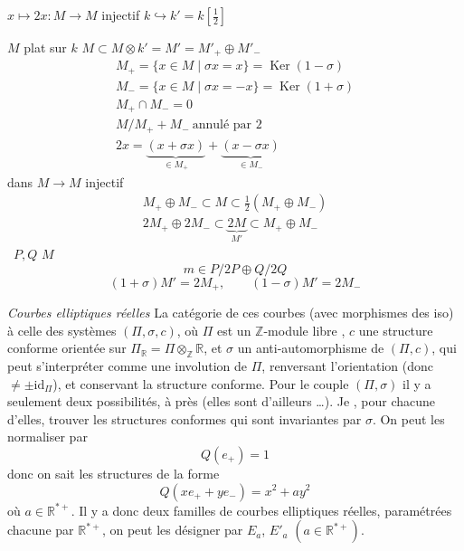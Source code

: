 \documentclass[11pt,a4paper]{article}
\begin{document}
$x \mapsto 2x : M \to M$ injectif \quad
{} $k \hookrightarrow k' = k[\tfrac{1}{2}]$

$M$ plat sur $k$ \quad
$M \subset M \otimes k' = M' = M'_{+} \oplus M'_{-}$ 
\[
\begin{array}{l}
  M_{+} = \{x \in M \mid \sigma x = x\} = \operatorname{Ker}(1 - \sigma) \\
  M_{-} = \{x \in M \mid \sigma x = -x\} = \operatorname{Ker}(1 + \sigma) \\
  M_{+} \cap M_{-} = 0 \\
  M/M_{+} + M_{-} \ \text{annulé par } 2 \\
  2x = \underbrace{(x + \sigma x)}_{\in M_{+}} + \underbrace{(x - \sigma x)}_{\in M_{-}}
\end{array}
\]
dans  $M \to M$ injectif
\[
\begin{array}{l}
  M_{+} \oplus M_{-} \subset M \subset \tfrac{1}{2}(M_{+} \oplus M_{-}) \\
  2M_{+} \oplus 2M_{-} \subset \underbrace{2M}_{M'} \subset M_{+} \oplus M_{-}
\end{array}
\]
 \ $P, Q$ \qquad $M$
\[
  m \in P/2P \oplus Q/2Q
\]
\[
  (1 + \sigma) M' = 2M_{+}, \qquad (1 - \sigma) M' = 2M_{-}
\]

\emph{Courbes elliptiques réelles}  La catégorie de ces
courbes (avec morphismes   des iso)
 à celle des systèmes \struck{\ill{}}
$(\Pi, \sigma, c)$, où $\Pi$ est un $\mathbb{Z}$-module libre ,
\struck{\ill{}} $c$ une structure  conforme orientée sur
$\Pi_{\mathbb{R}} = \Pi \otimes_{\mathbb{Z}} \mathbb{R}$, et $\sigma$ un
anti-automorphisme de   $(\Pi, c)$, qui peut
s'interpréter comme une  involution de $\Pi$, renversant l'orientation
(donc $\neq \pm \mathrm{id}_{\Pi}$), et conservant la structure conforme. Pour
le couple $(\Pi, \sigma)$ il y a seulement deux possibilités, à
 près (elles sont d'ailleurs  …). Je
, pour chacune d'elles,  trouver les structures
conformes qui sont invariantes par $\sigma$. On peut les normaliser par
\struck{\ill{}}
\[
  Q(e_{+}) = 1
\]
donc on sait les structures de la forme
\[
  Q(x e_{+} + y e_{-}) = x^{2} + a y^{2}
\]
où $a \in \mathbb{R}^{*+}$. Il y a donc deux familles de courbes elliptiques
réelles, paramétrées chacune par $\mathbb{R}^{*+}$, on peut les désigner par
$E_{a}$, $E'_{a}$ $(a \in \mathbb{R}^{*+})$. 
\end{document}
